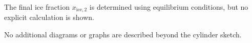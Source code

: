 The final ice fraction \( x_{\text{ice},2} \) is determined using equilibrium conditions, but no explicit calculation is shown.  

No additional diagrams or graphs are described beyond the cylinder sketch.
